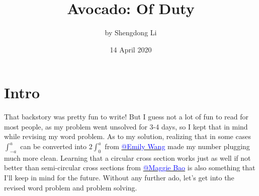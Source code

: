 \documentclass[letterpaper, 12pt]{article}
\begin{document}
\title{Avocado: Of Duty}
\author{by Shengdong Li}
\date{14 April 2020}
\maketitle
\section{Intro}
That backstory was pretty fun to write! But I guess not a lot of fun to read for most people, as my problem went unsolved for 3-4 days, so I kept that in mind while revising my word problem. As to my solution, realizing that in some cases $\int_{-a}^{a}$ can be converted into $2\int_{0}^{a}$ from \href{https://bsd.instructure.com/groups/27761/users/33323}{\textcolor{blue}{@Emily Wang}} made my number plugging much more clean. Learning that a circular cross section works just as well if not better than semi-circular cross sections from \href{https://bsd.instructure.com/groups/27761/users/29518}{\textcolor{blue}{@Maggie Bao}} is also something that I'll keep in mind for the future. Without any further ado, let’s get into the revised word problem and problem solving.
\end{document}
